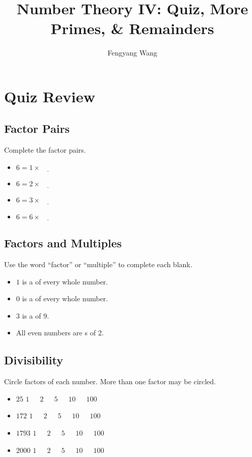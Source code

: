 \documentclass[a4paper,10pt]{article}
\title{Number Theory IV: Quiz, More Primes, \& Remainders}
\author{Fengyang Wang}
\begin{document}
\maketitle

\section{Quiz Review}

\subsection{Factor Pairs}

Complete the factor pairs.

\begin{itemize}
\item $6 = 1 \times \underline{\hspace{2em}}$
\item $6 = 2 \times \underline{\hspace{2em}}$
\item $6 = 3 \times \underline{\hspace{2em}}$
\item $6 = 6 \times \underline{\hspace{2em}}$
\end{itemize}

\subsection{Factors and Multiples}
Use the word ``factor'' or ``multiple'' to complete each blank.

\begin{itemize}
\item $1$ is a \blankF of every whole number.
\item $0$ is a \blankF of every whole number.
\item $3$ is a \blankF of $9$.
\item All even numbers are \blankF{}s of $2$.
\end{itemize}

\subsection{Divisibility}
Circle factors of each number. More than one factor may be circled.

\begin{itemize}
\item $25$ \hfill $1$~~~$2$~~~$5$~~~$10$~~~$100$
\item $172$ \hfill $1$~~~$2$~~~$5$~~~$10$~~~$100$
\item $1793$ \hfill $1$~~~$2$~~~$5$~~~$10$~~~$100$
\item $2000$ \hfill $1$~~~$2$~~~$5$~~~$10$~~~$100$
\end{itemize}
\end{document}
